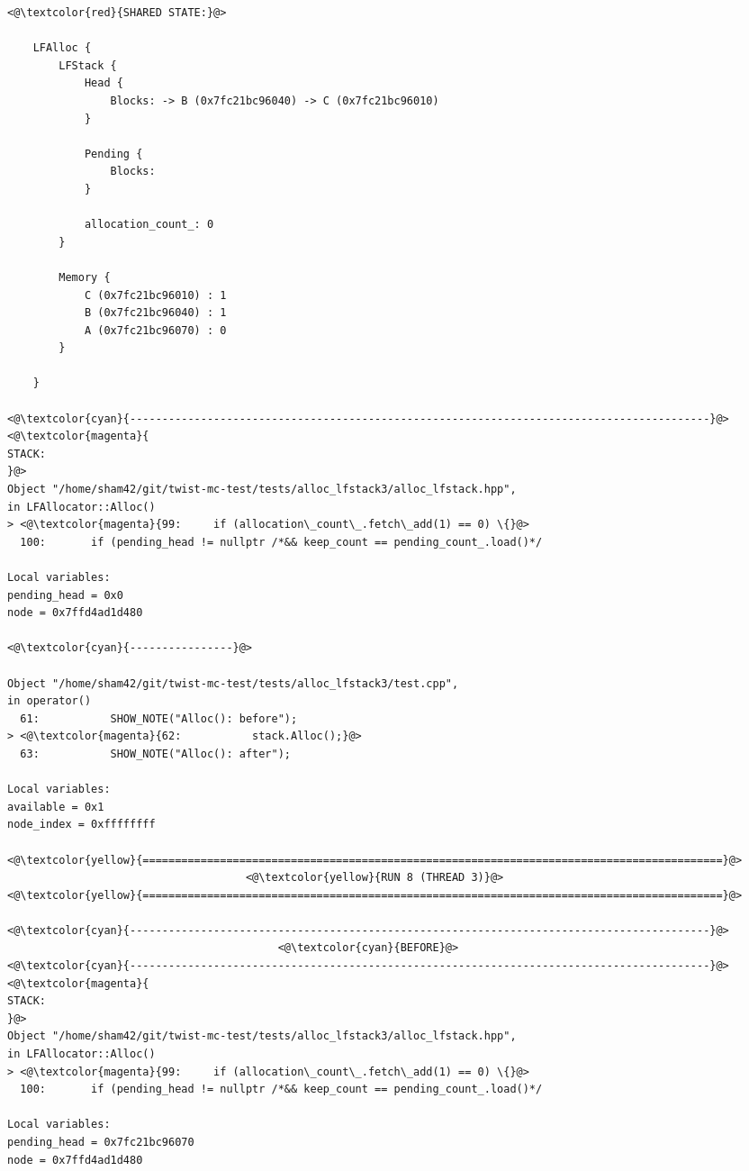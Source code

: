 \begin{adjustwidth}{-3.3cm}{-1cm}
\begin{allintypewriter}
\begin{multicols*}{2}
\begin{lstlisting}[numbers=none]
<@\textcolor{red}{SHARED STATE:}@>

    LFAlloc {
	    LFStack {
		    Head {
			    Blocks: -> B (0x7fc21bc96040) -> C (0x7fc21bc96010) 
		    }

		    Pending {
			    Blocks: 
		    }

		    allocation_count_: 0
	    }

	    Memory {
		    C (0x7fc21bc96010) : 1
		    B (0x7fc21bc96040) : 1
		    A (0x7fc21bc96070) : 0
	    }

    }

<@\textcolor{cyan}{------------------------------------------------------------------------------------------}@>
<@\textcolor{magenta}{
STACK:
}@>
Object "/home/sham42/git/twist-mc-test/tests/alloc_lfstack3/alloc_lfstack.hpp",
in LFAllocator::Alloc()
> <@\textcolor{magenta}{99:     if (allocation\_count\_.fetch\_add(1) == 0) \{}@>
  100:       if (pending_head != nullptr /*&& keep_count == pending_count_.load()*/

Local variables: 
pending_head = 0x0
node = 0x7ffd4ad1d480

<@\textcolor{cyan}{----------------}@>

Object "/home/sham42/git/twist-mc-test/tests/alloc_lfstack3/test.cpp",
in operator()
  61:           SHOW_NOTE("Alloc(): before");
> <@\textcolor{magenta}{62:           stack.Alloc();}@>
  63:           SHOW_NOTE("Alloc(): after");

Local variables: 
available = 0x1
node_index = 0xffffffff

<@\textcolor{yellow}{==========================================================================================}@>
                                     <@\textcolor{yellow}{RUN 8 (THREAD 3)}@>
<@\textcolor{yellow}{==========================================================================================}@>

<@\textcolor{cyan}{------------------------------------------------------------------------------------------}@>
                                          <@\textcolor{cyan}{BEFORE}@>
<@\textcolor{cyan}{------------------------------------------------------------------------------------------}@>
<@\textcolor{magenta}{
STACK:
}@>
Object "/home/sham42/git/twist-mc-test/tests/alloc_lfstack3/alloc_lfstack.hpp",
in LFAllocator::Alloc()
> <@\textcolor{magenta}{99:     if (allocation\_count\_.fetch\_add(1) == 0) \{}@>
  100:       if (pending_head != nullptr /*&& keep_count == pending_count_.load()*/

Local variables: 
pending_head = 0x7fc21bc96070
node = 0x7ffd4ad1d480


\end{lstlisting}
\end{multicols*}
\end{allintypewriter}
\end{adjustwidth}
